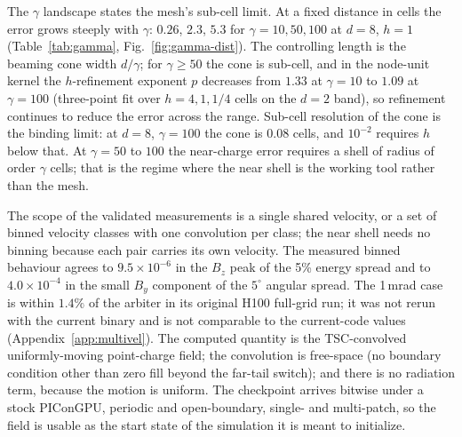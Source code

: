 The $\gamma$ landscape states the mesh's sub-cell limit. At a fixed
distance in cells the error grows steeply with $\gamma$:
$0.26$, $2.3$, $5.3$ for $\gamma=10,50,100$ at $d=8$,
$h=1$ (Table~\ref{tab:gamma}, Fig.~\ref{fig:gamma-dist}). The controlling
length is the beaming cone width $d/\gamma$; for $\gamma\ge50$ the cone is
sub-cell, and in the node-unit kernel the $h$-refinement exponent $p$
decreases from $1.33$ at $\gamma=10$ to $1.09$ at $\gamma=100$ (three-point
fit over $h=4,1,1/4$ cells on the $d=2$ band), so refinement continues to
reduce the error across the range. Sub-cell resolution of the cone
is the binding limit: at $d=8$, $\gamma=100$ the cone is $0.08$ cells, and
$10^{-2}$ requires $h$ below that. At $\gamma=50$ to $100$ the
near-charge error requires a shell of radius of order $\gamma$ cells; that
is the regime where the near shell is the working tool rather than the
mesh.

The scope of the validated measurements is a single shared velocity, or a
set of binned velocity classes with one convolution per class; the near
shell needs no binning because each pair carries its own velocity. The
measured binned behaviour agrees to $9.5\times10^{-6}$ in the $B_z$ peak
of the 5\% energy spread and to $4.0\times10^{-4}$ in the small $B_y$
component of the $5^\circ$ angular spread. The 1\,mrad case is within
$1.4\%$ of the arbiter in its original H100 full-grid run; it was not rerun
with the current binary and is not comparable to the current-code values
(Appendix~\ref{app:multivel}). The computed quantity is the
TSC-convolved uniformly-moving point-charge field; the convolution is
free-space (no boundary condition other than zero fill beyond the far-tail
switch); and there is no radiation term, because the motion is uniform.
The checkpoint arrives bitwise under a stock PIConGPU, periodic and
open-boundary, single- and multi-patch, so the field is usable as the start
state of the simulation it is meant to initialize.

